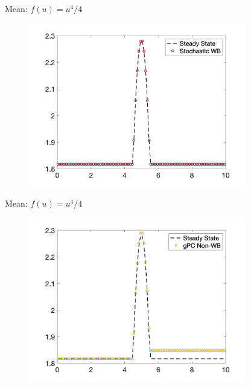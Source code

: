 \documentclass[
    pdf,
    11pt,
    xcolor={svgnames},
  ]{beamer}
\begin{document}
\begin{frame}{Mean: $f(u) = u^4 / 4$}
    \begin{figure}
    \centering
    \includegraphics[width=0.85\textwidth]{./Figures/u4_wb_mean}
    \end{figure}
\end{frame}
\begin{frame}{Mean: $f(u) = u^4 / 4$}
    \begin{figure}
    \centering
    \includegraphics[width=0.85\textwidth]{./Figures/u4_non_mean}
    \end{figure}
\end{frame}
\end{document}
